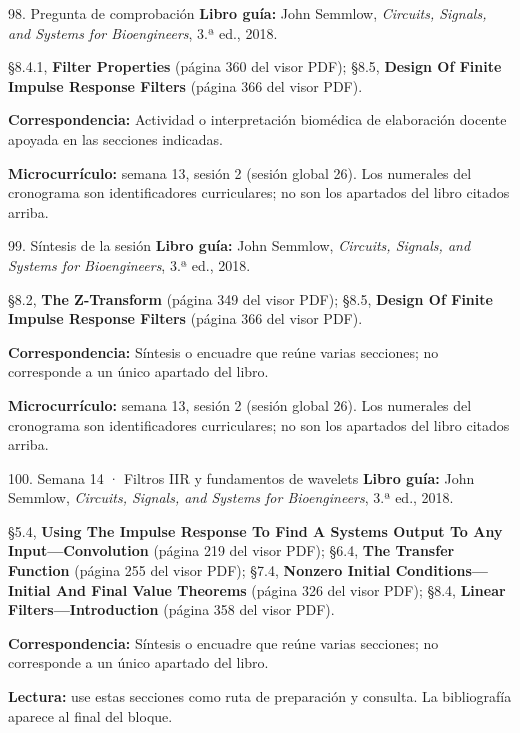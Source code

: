 \documentclass[
  10pt,
  ignorenonframetext,
  aspectratio=169,
  spanish,
]{beamer}
\begin{document}
\begin{frame}{98. Pregunta de comprobación}
\label{pregunta-de-comprobaciuxf3n-5}
\textbf{Libro guía:} John Semmlow, \emph{Circuits, Signals, and Systems
for Bioengineers}, 3.ª ed., 2018.

§8.4.1, \textbf{Filter Properties} (página 360 del visor PDF); §8.5,
\textbf{Design Of Finite Impulse Response Filters} (página 366 del visor
PDF).

\textbf{Correspondencia:} Actividad o interpretación biomédica de
elaboración docente apoyada en las secciones indicadas.

\textbf{Microcurrículo:} semana 13, sesión 2 (sesión global 26). Los
numerales del cronograma son identificadores curriculares; no son los
apartados del libro citados arriba.
\end{frame}

\begin{frame}{99. Síntesis de la sesión}
\label{suxedntesis-de-la-sesiuxf3n-5}
\textbf{Libro guía:} John Semmlow, \emph{Circuits, Signals, and Systems
for Bioengineers}, 3.ª ed., 2018.

§8.2, \textbf{The Z-Transform} (página 349 del visor PDF); §8.5,
\textbf{Design Of Finite Impulse Response Filters} (página 366 del visor
PDF).

\textbf{Correspondencia:} Síntesis o encuadre que reúne varias
secciones; no corresponde a un único apartado del libro.

\textbf{Microcurrículo:} semana 13, sesión 2 (sesión global 26). Los
numerales del cronograma son identificadores curriculares; no son los
apartados del libro citados arriba.
\end{frame}

\begin{frame}{100. Semana 14 · Filtros IIR y fundamentos de wavelets}
\label{semana-14-filtros-iir-y-fundamentos-de-wavelets}
\textbf{Libro guía:} John Semmlow, \emph{Circuits, Signals, and Systems
for Bioengineers}, 3.ª ed., 2018.

§5.4, \textbf{Using The Impulse Response To Find A Systems Output To Any
Input---Convolution} (página 219 del visor PDF); §6.4, \textbf{The
Transfer Function} (página 255 del visor PDF); §7.4, \textbf{Nonzero
Initial Conditions---Initial And Final Value Theorems} (página 326 del
visor PDF); §8.4, \textbf{Linear Filters---Introduction} (página 358 del
visor PDF).

\textbf{Correspondencia:} Síntesis o encuadre que reúne varias
secciones; no corresponde a un único apartado del libro.

\textbf{Lectura:} use estas secciones como ruta de preparación y
consulta. La bibliografía aparece al final del bloque.
\end{frame}
\end{document}
